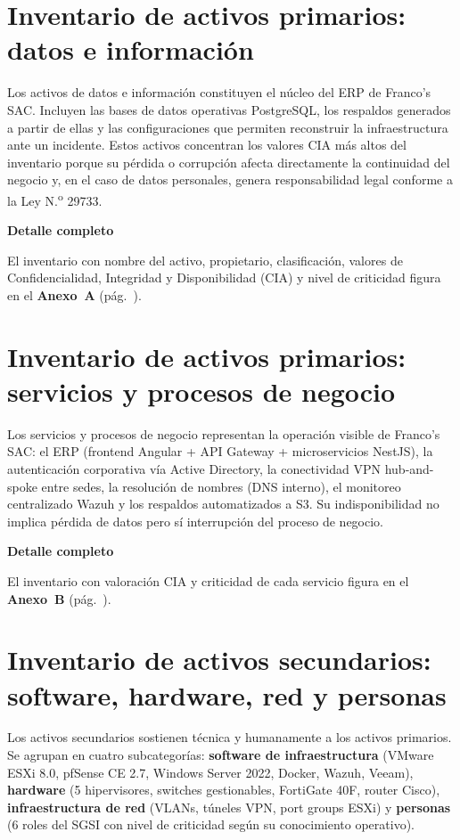 \documentclass[11pt, a4paper, oneside]{report}
\newenvironment{notabox}[1]{%
  \begin{lrbox}{\notaboxsb}%
  \begin{minipage}{\dimexpr\textwidth-2\fboxsep\relax}%
  \vspace{4pt}\textcolor{upeu_dark}{\textbf{#1}}\\[2pt]\small%
}{%
  \vspace{4pt}%
  \end{minipage}%
  \end{lrbox}%
  \vspace{6pt}\par\noindent\colorbox{upeu_light}{\usebox{\notaboxsb}}\par\vspace{6pt}%
}
\begin{document}
\section{Inventario de activos primarios: datos e información}

Los activos de datos e información constituyen el núcleo del ERP de Franco's SAC. Incluyen las bases de datos operativas PostgreSQL, los respaldos generados a partir de ellas y las configuraciones que permiten reconstruir la infraestructura ante un incidente. Estos activos concentran los valores CIA más altos del inventario porque su pérdida o corrupción afecta directamente la continuidad del negocio y, en el caso de datos personales, genera responsabilidad legal conforme a la Ley N.\textsuperscript{o} 29733.

\begin{notabox}{Detalle completo}
El inventario con nombre del activo, propietario, clasificación, valores de Confidencialidad, Integridad y Disponibilidad (CIA) y nivel de criticidad figura en el \textbf{Anexo~A} (pág.~\pageref{anex:activos_datos}).
\end{notabox}
\section{Inventario de activos primarios: servicios y procesos de negocio}

Los servicios y procesos de negocio representan la operación visible de Franco's SAC: el ERP (frontend Angular + API Gateway + microservicios NestJS), la autenticación corporativa vía Active Directory, la conectividad VPN hub-and-spoke entre sedes, la resolución de nombres (DNS interno), el monitoreo centralizado Wazuh y los respaldos automatizados a S3. Su indisponibilidad no implica pérdida de datos pero sí interrupción del proceso de negocio.

\begin{notabox}{Detalle completo}
El inventario con valoración CIA y criticidad de cada servicio figura en el \textbf{Anexo~B} (pág.~\pageref{anex:activos_servicios}).
\end{notabox}
\section{Inventario de activos secundarios: software, hardware, red y personas}

Los activos secundarios sostienen técnica y humanamente a los activos primarios. Se agrupan en cuatro subcategorías: \textbf{software de infraestructura} (VMware ESXi 8.0, pfSense CE 2.7, Windows Server 2022, Docker, Wazuh, Veeam), \textbf{hardware} (5 hipervisores, switches gestionables, FortiGate 40F, router Cisco), \textbf{infraestructura de red} (VLANs, túneles VPN, port groups ESXi) y \textbf{personas} (6 roles del SGSI con nivel de criticidad según su conocimiento operativo).
\end{document}
